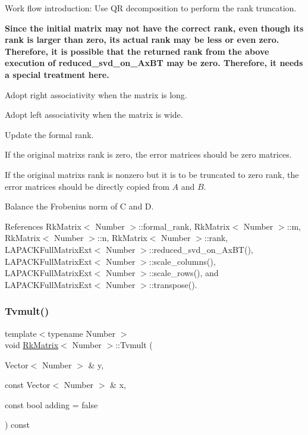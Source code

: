 Work flow introduction\+: Use QR decomposition to perform the rank truncation.

{\bfseries Since the initial matrix may not have the correct rank, even though its {\ttfamily rank} is larger than zero, its actual {\ttfamily rank} may be less or even zero. Therefore, it is possible that the returned {\ttfamily rank} from the above execution of {\ttfamily reduced\+\_\+svd\+\_\+on\+\_\+\+Ax\+BT} may be zero. Therefore, it needs a special treatment here.}

Adopt right associativity when the matrix is long.

Adopt left associativity when the matrix is wide.

Update the formal rank.

If the original matrix\textquotesingle{}s rank is zero, the error matrices should be zero matrices.

If the original matrix\textquotesingle{}s rank is nonzero but it is to be truncated to zero rank, the error matrices should be directly copied from $A$ and $B$.

Balance the Frobenius norm of {\ttfamily C} and {\ttfamily D}.

References Rk\+Matrix$<$ Number $>$\+::formal\+\_\+rank, Rk\+Matrix$<$ Number $>$\+::m, Rk\+Matrix$<$ Number $>$\+::n, Rk\+Matrix$<$ Number $>$\+::rank, L\+A\+P\+A\+C\+K\+Full\+Matrix\+Ext$<$ Number $>$\+::reduced\+\_\+svd\+\_\+on\+\_\+\+Ax\+B\+T(), L\+A\+P\+A\+C\+K\+Full\+Matrix\+Ext$<$ Number $>$\+::scale\+\_\+columns(), L\+A\+P\+A\+C\+K\+Full\+Matrix\+Ext$<$ Number $>$\+::scale\+\_\+rows(), and L\+A\+P\+A\+C\+K\+Full\+Matrix\+Ext$<$ Number $>$\+::transpose().

\mbox{\label{classRkMatrix_a7162dd0c4580dbb5e98715d9b8dd56c1}} 
\subsubsection{\texorpdfstring{Tvmult()}{Tvmult()}}
{\footnotesize\ttfamily template$<$typename Number $>$ \\
void \hyperlink{classRkMatrix}{Rk\+Matrix}$<$ Number $>$\+::Tvmult (\begin{DoxyParamCaption}\item[{Vector$<$ Number $>$ \&}]{y,  }\item[{const Vector$<$ Number $>$ \&}]{x,  }\item[{const bool}]{adding = {\ttfamily false} }\end{DoxyParamCaption}) const}

